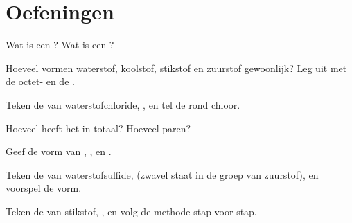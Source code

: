 \section{Oefeningen}

\begin{exercise}[$\star$]\label{exo:g10:lewis-and-shape:1}
Wat is een ? Wat is een ?
\end{exercise}

\begin{exercise}[$\star$]\label{exo:g10:lewis-and-shape:2}
Hoeveel  vormen waterstof, koolstof, stikstof en
zuurstof gewoonlijk? Leg uit met de octet- en de .
\end{exercise}

\begin{exercise}[$\star$]\label{exo:g10:lewis-and-shape:3}
Teken de  van waterstofchloride, , en tel de
 rond chloor.
\end{exercise}

\begin{exercise}[$\star$]\label{exo:g10:lewis-and-shape:4}
Hoeveel  heeft het   in totaal?
Hoeveel paren?
\end{exercise}

\begin{exercise}[$\star$]\label{exo:g10:lewis-and-shape:5}
Geef de vorm van , ,  en .
\end{exercise}

\begin{exercise}[$\star\star$]\label{exo:g10:lewis-and-shape:6}
Teken de  van waterstofsulfide,  (zwavel staat in
de groep van zuurstof), en voorspel de vorm.
\end{exercise}

\begin{exercise}[$\star\star$]\label{exo:g10:lewis-and-shape:7}
Teken de  van stikstof, , en volg de methode stap
voor stap.
\end{exercise}

